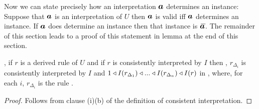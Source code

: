 Now we can state precisely how an interpretation $\iI$ determines an instance: 
Suppose that $\iI$ is an interpretation of $U$  then $\iI$ is valid  iff $\iI$ determines an instance. 
If $\iI$ does determine an instance then that instance is $\Ibar$.
The remainder of this section leads to a proof of this statement in
lemma   at the end of this section.

\begin{lemma}
\IfIpartialmappingUtoC, if $r$ is a derived rule \ZDelta of $U$ and if
$r$ is consistently interpreted by $I$ 
then \foreachi, $r_{\Delta_i}$ is consistently interpreted by $I$ and 
$1 \triangleleft I(r_{\Delta_1}) \triangleleft ... \triangleleft I(r_{\Delta_n}) \triangleleft I(r)$ in \catc,
where, for each $i$, $r_{\Delta_i}$ is the rule .
\end{lemma}
\begin{proof}
Follows from clause (i)(b) of the definition of consistent interpretation.
\end{proof}

\iffalse
\begin{lemma}
\llabel{substitutionsublemma}
\IfIpartialmappingUtoC,
then if $r_s$ is the $\in$-rule \ZsOmega and 
$r_s$ is consistently interpreted by $I$ then
for all contexts $Q$ and for all realisations $\tuple{\sm}$ of $\yOmega{m}$ wrt $Q$  
which are mapped to a cascade by $I$,
$$ \Imappedrule{Q}{\ofT{s[\SUBsFORy{m}]}{\Omega[\SUBsFORy{m}]}} 
= I(r_{s_m})^*...I(r_{s_1})^*(\crossx{I(Q)}{I(r_s)}{1})
\in Sect (I(r_{s_m})^*...I(r_{s_1})^*(\crossx{I(Q)}{I(r_\Omega)}{1})),$$
where \foreachj, $r_{s_j}$ is the rule \IsOmega{j} and where
$r_\Omega$ is the rule \ZOmega.
\end{lemma}
\begin{proof}
The definition of consistent interpretation directly requires this for non-variables. 
It remains to show  this in the case when $s$ is a variable. Suppose $s$ is the variable
$y_j$. Since in this case $s[\SUBsFORy{m}]$ is $s_j$ what we have to show is that
$I(s_j) = I(r_{s_m})^*...I(r_{s_1})^*(\crossx{I(Q)}{s(p_{I(r_{\Omega_m}),I(r_{\Omega_j})}}{1}))$,
where \foreachj, $r_{\Omega_j}$ is the rule \IOmega{j}. This is given by lemma \lref{cascadeprojectionlemma}.
\end{proof}
\fi

